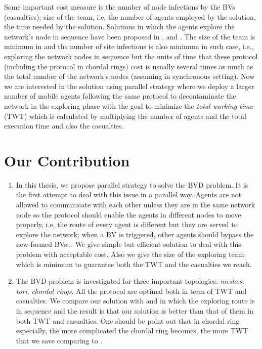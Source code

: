 Some important cost measure is the number of node infections by the BVs (casualties); size of the team, i.e, the number of agents employed by the solution, the time needed by the solution. Solutions in which the agents explore the network's node in sequence have been proposed in \cite{Cai}, \cite{Alotaibi} and \cite{ Cai1}. The size of the team is minimum in \cite{Cai,Cai1} and the number of site infections is also minimum in such case, i.e., exploring the network nodes in sequence but the units of time that these protocol (including the protocol in chordal rings) cost is usually several times as much as the total number of the network's nodes (assuming in synchronous setting). Now we are interested in the solution using parallel strategy where we deploy a larger number of mobile agents following the same protocol to decontaminate the network in the exploring phase with the goal to minimize the {\em total working time} (TWT) which is calculated by multiplying the number of agents and the total execution time and also the casualties.


\section{Our Contribution} 


\begin{enumerate}
\item In this thesis, we propose parallel strategy to solve the BVD problem. It is the first attempt to deal with this issue in a parallel way. Agents are not allowed to communicate with each other unless they are in the same network node so the protocol should enable the agents in different nodes to move properly, i.e, the route of every agent is different but they are served to explore the network; when a BV is triggered, other agents should bypass the new-formed BVs... We give simple but efficient solution to deal with this problem with acceptable cost. Also we give the size of the exploring team which is minimum to guarantee both the TWT and the  casualties we reach.
\item The BVD problem is investigated for three important topologies: {\em meshes}, {\em tori}, {\em chordal rings}. All the protocol are optimal both in term of TWT and casualties. We compare our solution with \cite{Cai} and \cite{Alotaibi} in which the exploring route is in sequence and the result is that our solution is better than that of them in both TWT and casualties. One should be point out that in chordal ring especially, the more complicated the chordal ring becomes, the more TWT that we save comparing to \cite{Alotaibi}.
\end{enumerate}

